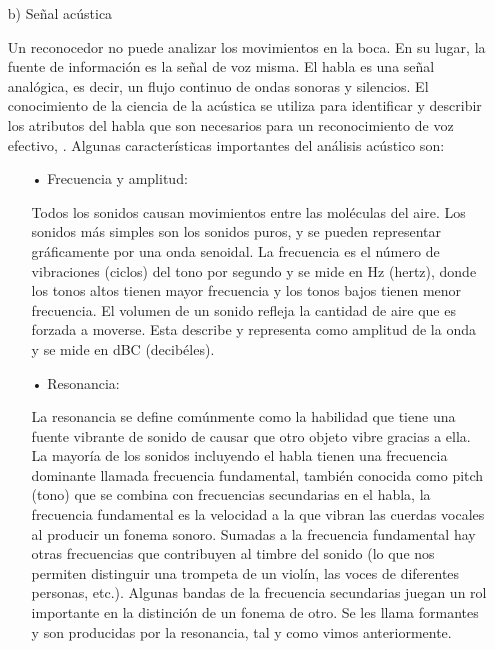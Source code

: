 \begin{enumerate}
\newpage
\item[b)]Señal acústica
\par
Un reconocedor no puede analizar los movimientos en la boca. En su lugar, la fuente de información es la señal de voz misma. El habla es una señal analógica, es decir, un flujo continuo de ondas sonoras y silencios. El conocimiento de la ciencia de la acústica se utiliza para identificar y describir los atributos del habla que son necesarios para un reconocimiento de voz efectivo, \cite{luis}.
\vskip 0.5cm
Algunas características importantes del análisis acústico son:
\begin{enumerate}
\item[•]Frecuencia y amplitud:
\par
Todos los sonidos causan movimientos entre las moléculas del aire. Los sonidos más simples son los sonidos puros, y se pueden representar gráficamente por una onda senoidal. 
\vskip 0.5cm
La frecuencia es el número de vibraciones (ciclos) del tono por segundo y se mide en Hz (hertz), donde los tonos altos tienen mayor frecuencia y los tonos bajos tienen menor frecuencia.
\vskip 0.5cm
El volumen de un sonido refleja la cantidad de aire que es forzada a moverse. Esta describe y representa como amplitud de la onda y se mide en dBC (decibéles).
\vskip 0.5cm

\item[•]Resonancia:
\par
La resonancia se define comúnmente como la habilidad que tiene una fuente vibrante de sonido de causar que otro objeto vibre gracias a ella. La mayoría de los sonidos incluyendo el habla tienen una frecuencia dominante llamada frecuencia fundamental, también conocida como pitch (tono) que se combina con frecuencias secundarias en el habla, la frecuencia fundamental es la velocidad a la que vibran las cuerdas vocales al producir un fonema sonoro. Sumadas a la frecuencia fundamental hay otras frecuencias que contribuyen al timbre del sonido (lo que nos permiten distinguir una trompeta de un violín, las voces de diferentes personas, etc.). Algunas bandas de la frecuencia secundarias juegan un rol importante en la distinción de un fonema de otro. Se les llama formantes y son producidas por la resonancia, tal y como vimos anteriormente.


\end{enumerate}
\end{enumerate}
